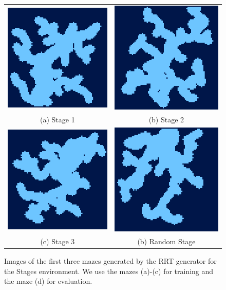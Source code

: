 \begin{figure}[htp]
    \begin{center}
        \begin{tabular}{cc}
            \includegraphics[clip, width=0.25\columnwidth]{figures/evaluation/randomness/instances/stage0_upscaled.png} &
            \includegraphics[clip, width=0.25\columnwidth]{figures/evaluation/randomness/instances/stage1_upscaled.png} \\
            {\small (a) Stage 1} & {\small (b) Stage 2} \\
            \addlinespace[0.25cm]
            \includegraphics[clip, width=0.25\columnwidth]{figures/evaluation/randomness/instances/stage2_upscaled.png} &
            \includegraphics[clip, width=0.25\columnwidth]{figures/evaluation/randomness/instances/stage3_upscaled.png} \\
            {\small (c) Stage 3} & {\small (b) Random Stage} \\
            
        \end{tabular}
    \end{center}
    \caption[Images of Random Mazes Used by the Stages Environment]{Images of the first three mazes generated by the RRT generator for the Stages environment. We use the mazes (a)-(c) for training and the maze (d) for evaluation.} \label{fig:Eval/RandomMazes/Stages}
\end{figure}

